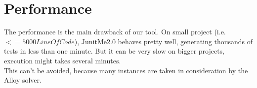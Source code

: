 \section{Performance}
\label{sec:Performance}
	The performance is the main drawback of our tool. On small project (i.e. $<= 5000 LineOfCode$), JunitMe2.0 behaves pretty well, generating thousands of tests in less than one minute. But it can be very slow on bigger projects, execution might takes several minutes.\\
	This can't be avoided, because many instances are taken in consideration by the Alloy solver.